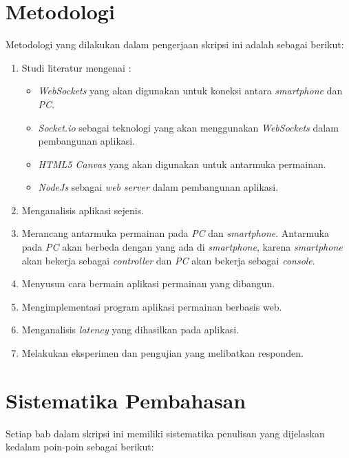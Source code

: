 \section{Metodologi}
\label{sec:metlit}
Metodologi yang dilakukan dalam pengerjaan skripsi ini adalah sebagai berikut:

\begin{enumerate}
	\item Studi literatur mengenai :
		\begin{itemize}
			\item \textit{WebSockets} yang akan digunakan untuk koneksi antara \textit{smartphone} dan \textit{PC}.
			\item \textit{Socket.io} sebagai teknologi yang akan menggunakan \textit{WebSockets} dalam pembangunan aplikasi.
			\item \textit{HTML5 Canvas} yang akan digunakan untuk antarmuka permainan.
			\item \textit{NodeJs} sebagai \textit{web server} dalam pembangunan aplikasi. 	
		\end{itemize}
	\item Menganalisis aplikasi sejenis.
	\item Merancang antarmuka permainan pada \textit{PC} dan \textit{smartphone}. Antarmuka pada \textit{PC} akan berbeda dengan yang ada di \textit{smartphone}, karena \textit{smartphone} akan bekerja sebagai \textit{controller} dan \textit{PC} akan bekerja sebagai \textit{console}.
	\item Menyusun cara bermain aplikasi permainan yang dibangun.
	\item Mengimplementasi program aplikasi permainan berbasis web.
	\item Menganalisis \textit{latency} yang dihasilkan pada aplikasi.
	\item Melakukan eksperimen dan pengujian yang melibatkan responden.
\end{enumerate}

\section{Sistematika Pembahasan}
\label{sec:sispem}
Setiap bab dalam skripsi ini memiliki sistematika penulisan yang dijelaskan kedalam poin-poin sebagai berikut:

